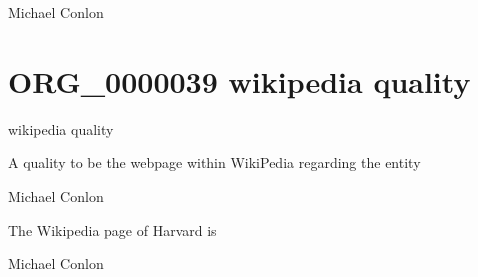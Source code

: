 \documentclass[letterpaper,10pt,english]{sphinxmanual}
\begin{document}
\begin{sphinxShadowBox}

\sphinxAtStartPar
Michael Conlon 
\end{sphinxShadowBox}
\begin{quote}
\label{\detokenize{doc-ORG_0000039:org-0000039}}\label{\detokenize{doc-ORG_0000039:wikipedia-quality}}\label{\detokenize{doc-ORG_0000039:org-0000039}}
\ignorespaces \end{quote}


\section{ORG\_0000039 \sphinxhyphen{} wikipedia quality}
\label{\detokenize{doc-ORG_0000039:org-0000039-wikipedia-quality}}\label{\detokenize{doc-ORG_0000039:index-0}}\label{\detokenize{doc-ORG_0000039::doc}}
\begin{sphinxShadowBox}

\sphinxAtStartPar
wikipedia quality
\end{sphinxShadowBox}

\begin{sphinxShadowBox}

\sphinxAtStartPar
A quality to be the webpage within WikiPedia regarding the entity
\end{sphinxShadowBox}

\begin{sphinxShadowBox}

\sphinxAtStartPar
Michael Conlon 
\end{sphinxShadowBox}

\begin{sphinxShadowBox}

\sphinxAtStartPar
The Wikipedia page of Harvard is 
\end{sphinxShadowBox}

\begin{sphinxShadowBox}

\sphinxAtStartPar
Michael Conlon 
\end{sphinxShadowBox}
\begin{quote}
\label{\detokenize{doc-ORG_0000040:org-0000040}}\label{\detokenize{doc-ORG_0000040:architectural-structure}}\label{\detokenize{doc-ORG_0000040:org-0000040}}
\ignorespaces \end{quote}
\end{document}
